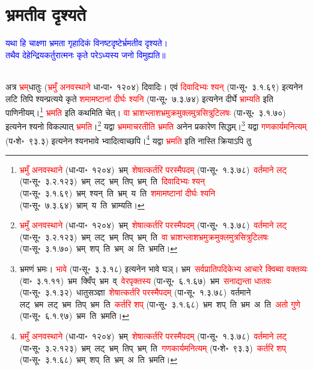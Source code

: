 \section[भ्रमतीव दृश्यते]{भ्रमतीव दृश्यते}
\centering\textcolor{blue}{यथा हि चाक्ष्णा भ्रमता गृहादिकं विनष्टदृष्टेर्भ्रमतीव दृश्यते।\nopagebreak\\
तथैव देहेन्द्रियकर्तुरात्मनः कृते परेऽध्यस्य जनो विमुह्यति॥}\nopagebreak\\
\\
\fontsize{14}{21}\selectfont\begin{sloppypar}\justifying\noindent\hspace{10mm} अत्र \textcolor{red}{भ्रम्‌}\-धातुः (\textcolor{red}{भ्रमुँ अनवस्थाने} धा॰पा॰~१२०४) दिवादिः। एवं \textcolor{red}{दिवादिभ्यः श्यन्} (पा॰सू॰~३.१.६९) इत्यनेन लटि तिपि श्यन्प्रत्यये कृते \textcolor{red}{शमामष्टानां दीर्घः श्यनि} (पा॰सू॰~७.३.७४) इत्यनेन दीर्घे \textcolor{red}{भ्राम्यति} इति पाणिनीयम्।\footnote{\textcolor{red}{भ्रमुँ अनवस्थाने} (धा॰पा॰~१२०४)~\arrow भ्रम्~\arrow \textcolor{red}{शेषात्कर्तरि परस्मैपदम्} (पा॰सू॰~१.३.७८)~\arrow \textcolor{red}{वर्तमाने लट्} (पा॰सू॰~३.२.१२३)~\arrow भ्रम्~लट्~\arrow भ्रम्~तिप्~\arrow भ्रम्~ति~\arrow \textcolor{red}{दिवादिभ्यः श्यन्} (पा॰सू॰~३.१.६९)~\arrow भ्रम्~श्यन्~ति~\arrow भ्रम्~य~ति~\arrow \textcolor{red}{शमामष्टानां दीर्घः श्यनि} (पा॰सू॰~७.३.६४)~\arrow भ्राम्~य~ति~\arrow भ्राम्यति।} \textcolor{red}{भ्रमति} इति कथमिति चेत्। \textcolor{red}{वा भ्राश\-भ्लाश\-भ्रमु\-क्रमु\-क्लमु\-त्रसि\-त्रुटि\-लषः} (पा॰सू॰~३.१.७०) इत्यनेन श्यनो विकल्पात् \textcolor{red}{भ्रमति}।\footnote{\textcolor{red}{भ्रमुँ अनवस्थाने} (धा॰पा॰~१२०४)~\arrow भ्रम्~\arrow \textcolor{red}{शेषात्कर्तरि परस्मैपदम्} (पा॰सू॰~१.३.७८)~\arrow \textcolor{red}{वर्तमाने लट्} (पा॰सू॰~३.२.१२३)~\arrow भ्रम्~लट्~\arrow भ्रम्~तिप्~\arrow भ्रम्~ति~\arrow \textcolor{red}{वा भ्राश\-भ्लाश\-भ्रमु\-क्रमु\-क्लमु\-त्रसि\-त्रुटि\-लषः} (पा॰सू॰~३.१.७०)~\arrow भ्रम्~शप्~ति~\arrow भ्रम्~अ~ति~\arrow भ्रमति।} यद्वा \textcolor{red}{भ्रममाचरतीति भ्रमति} अनेन प्रकारेण सिद्धम्।\footnote{भ्रमणं भ्रमः। \textcolor{red}{भावे} (पा॰सू॰~३.३.१८) इत्यनेन भावे घञ्। भ्रम~\arrow \textcolor{red}{सर्वप्राति\-पदिकेभ्य आचारे क्विब्वा वक्तव्यः} (वा॰~३.१.११)~\arrow भ्रम~क्विँप्~\arrow भ्रम~व्~\arrow \textcolor{red}{वेरपृक्तस्य} (पा॰सू॰~६.१.६७)~\arrow भ्रम~\arrow \textcolor{red}{सनाद्यन्ता धातवः} (पा॰सू॰~३.१.३२)~\arrow धातुसञ्ज्ञा~\arrow \textcolor{red}{शेषात्कर्तरि परस्मैपदम्} (पा॰सू॰~१.३.७८)~\arrow वर्तमाने लट्~\arrow भ्रम~लट्~\arrow भ्रम~तिप्~\arrow भ्रम~ति~\arrow \textcolor{red}{कर्तरि शप्‌} (पा॰सू॰~३.१.६८)~\arrow भ्रम~शप्~ति~\arrow भ्रम~अ~ति~\arrow \textcolor{red}{अतो गुणे} (पा॰सू॰~६.१.९७)~\arrow भ्रम~ति~\arrow भ्रमति।} यद्वा \textcolor{red}{गण\-कार्यमनित्यम्} (प॰शे॰~९३.३) इत्यनेन श्यनभावे भ्वादित्वाच्छपि।\footnote{\textcolor{red}{भ्रमुँ अनवस्थाने} (धा॰पा॰~१२०४)~\arrow भ्रम्~\arrow \textcolor{red}{शेषात्कर्तरि परस्मैपदम्} (पा॰सू॰~१.३.७८)~\arrow \textcolor{red}{वर्तमाने लट्} (पा॰सू॰~३.२.१२३)~\arrow भ्रम्~लट्~\arrow भ्रम्~तिप्~\arrow भ्रम्~ति~\arrow \textcolor{red}{गण\-कार्यमनित्यम्} (प॰शे॰~९३.३)~\arrow \textcolor{red}{कर्तरि शप्} (पा॰सू॰~३.१.६८)~\arrow भ्रम्~शप्~ति~\arrow भ्रम्~अ~ति~\arrow भ्रमति।} यद्वा \textcolor{red}{भ्रमति} इति नास्ति क्रियाऽपि तु 

\end{sloppypar}
